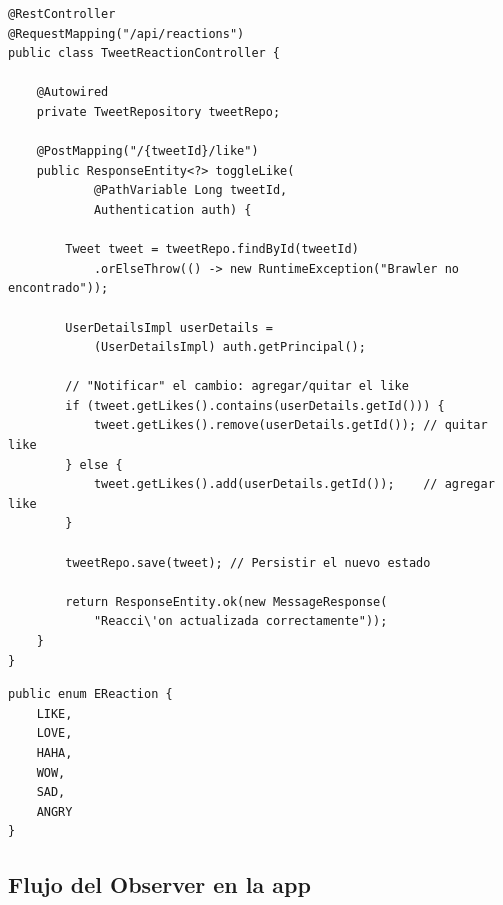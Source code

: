 \documentclass[12pt,a4paper]{article}
\begin{document}
\begin{lstlisting}[caption={TweetReactionController.java -- El controlador notifica cambios}]
@RestController
@RequestMapping("/api/reactions")
public class TweetReactionController {

    @Autowired
    private TweetRepository tweetRepo;

    @PostMapping("/{tweetId}/like")
    public ResponseEntity<?> toggleLike(
            @PathVariable Long tweetId,
            Authentication auth) {

        Tweet tweet = tweetRepo.findById(tweetId)
            .orElseThrow(() -> new RuntimeException("Brawler no encontrado"));

        UserDetailsImpl userDetails =
            (UserDetailsImpl) auth.getPrincipal();

        // "Notificar" el cambio: agregar/quitar el like
        if (tweet.getLikes().contains(userDetails.getId())) {
            tweet.getLikes().remove(userDetails.getId()); // quitar like
        } else {
            tweet.getLikes().add(userDetails.getId());    // agregar like
        }

        tweetRepo.save(tweet); // Persistir el nuevo estado

        return ResponseEntity.ok(new MessageResponse(
            "Reacci\'on actualizada correctamente"));
    }
}
\end{lstlisting}

\begin{lstlisting}[caption={EReaction.java -- Tipos de reacciones disponibles}]
public enum EReaction {
    LIKE,
    LOVE,
    HAHA,
    WOW,
    SAD,
    ANGRY
}
\end{lstlisting}

\subsection{Flujo del Observer en la app}
\end{document}
